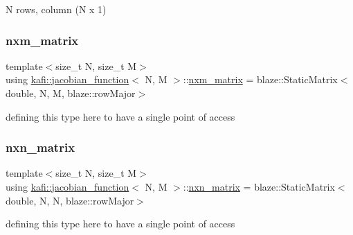 {\ttfamily N} rows, {} column {\ttfamily (N x 1)} \mbox{\label{classkafi_1_1jacobian__function_a3894846c2c1903184c3473698dc89152}} 
\subsubsection{\texorpdfstring{nxm\+\_\+matrix}{nxm\_matrix}}
{\footnotesize\ttfamily template$<$size\+\_\+t N, size\+\_\+t M$>$ \\
using \hyperlink{classkafi_1_1jacobian__function}{kafi\+::jacobian\+\_\+function}$<$ N, M $>$\+::\hyperlink{classkafi_1_1jacobian__function_a3894846c2c1903184c3473698dc89152}{nxm\+\_\+matrix} =  blaze\+::\+Static\+Matrix$<$double, N, M, blaze\+::row\+Major$>$}

defining this type here to have a single point of access \mbox{\label{classkafi_1_1jacobian__function_a5bac68a534ee628e1e474cf46a7ff035}} 
\subsubsection{\texorpdfstring{nxn\+\_\+matrix}{nxn\_matrix}}
{\footnotesize\ttfamily template$<$size\+\_\+t N, size\+\_\+t M$>$ \\
using \hyperlink{classkafi_1_1jacobian__function}{kafi\+::jacobian\+\_\+function}$<$ N, M $>$\+::\hyperlink{classkafi_1_1jacobian__function_a5bac68a534ee628e1e474cf46a7ff035}{nxn\+\_\+matrix} =  blaze\+::\+Static\+Matrix$<$double, N, N, blaze\+::row\+Major$>$}

defining this type here to have a single point of access \mbox{\label{classkafi_1_1jacobian__function_a4133d937d8f1d502de7424cb1f4f4e36}} 
